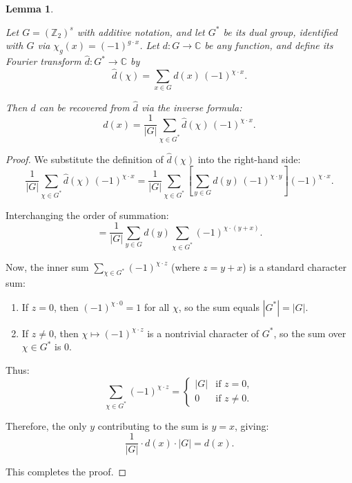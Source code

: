 \documentclass[12pt,twoside,]{amsart}
\theoremstyle{plain}
\newtheorem{lemma}[theorem]{Lemma}
\theoremstyle{definition}
\begin{document}
\begin{lemma} \label{lemma: Inverse Fourier Transform}

Let \( G = (\mathbb{Z}_2)^s \) with additive notation, and let \( G^* \) be its dual group, identified with \( G \) via \( \chi_g(x) = (-1)^{g \cdot x} \).  
Let \( d: G \to \mathbb{C} \) be any function, and define its Fourier transform \( \widehat{d}: G^* \to \mathbb{C} \) by
\[
\widehat{d}(\chi) = \sum_{x \in G} d(x) \, (-1)^{\chi \cdot x}.
\]

Then \( d \) can be recovered from \( \widehat{d} \) via the inverse formula:
\[
d(x) = \frac{1}{|G|} \sum_{\chi \in G^*} \widehat{d}(\chi) \, (-1)^{\chi \cdot x}.
\]

\end{lemma}

\begin{proof}

We substitute the definition of \( \widehat{d}(\chi) \) into the right-hand side:
\[
\frac{1}{|G|} \sum_{\chi \in G^*} \widehat{d}(\chi) \, (-1)^{\chi \cdot x}
= \frac{1}{|G|} \sum_{\chi \in G^*} \left[ \sum_{y \in G} d(y) \, (-1)^{\chi \cdot y} \right] (-1)^{\chi \cdot x}.
\]

Interchanging the order of summation:
\[
= \frac{1}{|G|} \sum_{y \in G} d(y) \sum_{\chi \in G^*} (-1)^{\chi \cdot (y + x)}.
\]

Now, the inner sum \( \sum_{\chi \in G^*} (-1)^{\chi \cdot z} \) (where \( z = y + x \)) is a standard character sum:

\begin{enumerate}
    \item If \( z = 0 \), then \( (-1)^{\chi \cdot 0} = 1 \) for all \( \chi \), so the sum equals \( |G^*| = |G| \).
    \item If \( z \neq 0 \), then \( \chi \mapsto (-1)^{\chi \cdot z} \) is a nontrivial character of \( G^* \), so the sum over \( \chi \in G^* \) is 0.
\end{enumerate}

Thus:
\[
\sum_{\chi \in G^*} (-1)^{\chi \cdot z} = 
\begin{cases}
|G| & \text{if } z = 0, \\
0 & \text{if } z \neq 0.
\end{cases}
\]

Therefore, the only \( y \) contributing to the sum is \( y = x \), giving:
\[
\frac{1}{|G|} \cdot d(x) \cdot |G| = d(x).
\]

This completes the proof.

\end{proof}
\end{document}
